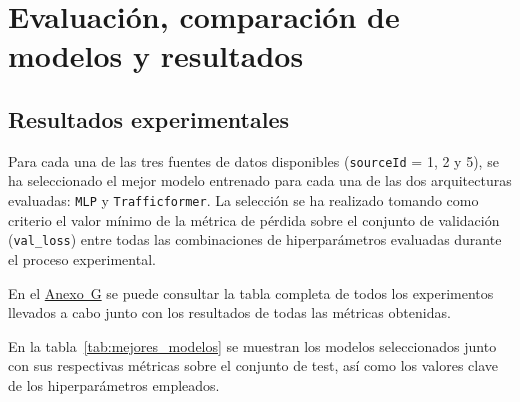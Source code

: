 \section{Evaluación, comparación de modelos y resultados}
\label{sec:evaluacion}

%
%

\subsection{Resultados experimentales}
\label{sec:resultados_exp}

Para cada una de las tres fuentes de datos disponibles (\texttt{sourceId} = 1, 2 y 5), se ha seleccionado el mejor modelo entrenado para cada una de las dos arquitecturas evaluadas: \texttt{MLP} y \texttt{Trafficformer}. La selección se ha realizado tomando como criterio el valor mínimo de la métrica de pérdida sobre el conjunto de validación (\texttt{val\_loss}) entre todas las combinaciones de hiperparámetros evaluadas durante el proceso experimental.

En el \hyperref[anexo:resultados_exp]{Anexo~G} se puede consultar la tabla completa de todos los experimentos llevados a cabo junto con los resultados de todas las métricas obtenidas.

En la tabla~\ref{tab:mejores_modelos} se muestran los modelos seleccionados junto con sus respectivas métricas sobre el conjunto de test, así como los valores clave de los hiperparámetros empleados.

